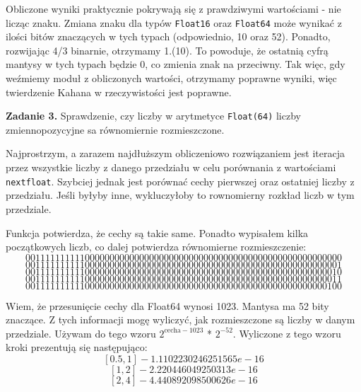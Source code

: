 \documentclass[15pt, a4paper]{article}
\begin{document}

Obliczone wyniki praktycznie pokrywają się z prawdziwymi wartościami - nie licząc znaku. Zmiana znaku dla typów \verb|Float16| oraz \verb|Float64| może wynikać z ilości bitów znaczących w tych typach (odpowiednio, 10 oraz 52). Ponadto, rozwijając 4/3 binarnie, otrzymamy 1.(10). To powoduje, że ostatnią cyfrą mantysy w tych typach będzie 0, co zmienia znak na przeciwny. Tak więc, gdy weźmiemy moduł z obliczonych wartości, otrzymamy poprawne wyniki, więc twierdzenie Kahana w rzeczywistości jest poprawne.

\vspace{0.5cm}

\noindent\hrulefill


\vspace{0.5cm}

\noindent\textbf{Zadanie 3.} Sprawdzenie, czy liczby w arytmetyce \verb|Float(64)| liczby zmiennopozycyjne sa równomiernie rozmieszczone.

\vspace{0.5cm}


Najprostrzym, a zarazem najdłuższym obliczeniowo rozwiązaniem jest iteracja przez wszystkie liczby z danego przedziału w celu porównania z wartościami \verb|nextfloat|. Szybciej jednak jest porównać cechy pierwszej oraz ostatniej liczby z przedziału. Jeśli byłyby inne, wykluczyłoby to rownomierny rozkład liczb w tym przedziale.

Funkcja potwierdza, że cechy są takie same. Ponadto wypisałem kilka początkowych liczb, co dalej potwierdza równomierne rozmieszczenie:
\[0011111111110000000000000000000000000000000000000000000000000000\]
\[0011111111110000000000000000000000000000000000000000000000000001\]
\[0011111111110000000000000000000000000000000000000000000000000010\]
\[0011111111110000000000000000000000000000000000000000000000000011\]
\[0011111111110000000000000000000000000000000000000000000000000100\]

\vspace{0.5cm}

Wiem, że przesunięcie cechy dla Float64 wynosi 1023. Mantysa ma 52 bity znaczące. Z tych informacji mogę wyliczyć, jak rozmieszczone są liczby w danym przedziale. Używam do tego wzoru $2^{\mathrm{cecha - 1023}}$ * $2^{\mathrm{-52}}$. Wyliczone z tego wzoru kroki prezentują się następująco:
\[[0.5, 1] - 1.1102230246251565e-16\]
\[[1, 2] - 2.220446049250313e-16\]
\[[2, 4] - 4.440892098500626e-16\]
\end{document}
